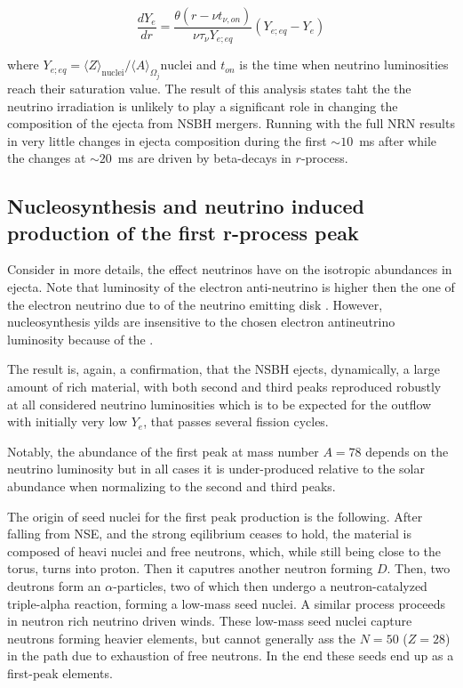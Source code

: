 \begin{equation}
\frac{d Y_e}{dr} = \frac{\theta(r - \nu t_{\nu, on})}{\nu \tau_{\nu} Y_{e; eq}}(Y_{e; eq} - Y_e)
\end{equation}

where $Y_{e; eq} = \langle Z \rangle_{\text{nuclei}} / \langle A \rangle_{\Omega_j}\text{nuclei}$ and $t_{on}$ is the time when neutrino luminosities reach their saturation value.
The result of this analysis states taht the the neutrino irradiation is unlikely to play a significant role in changing the composition of the ejecta from \ac{NSBH} mergers.
Running with the full \ac{NRN} results in very little changes in ejecta composition during the first $\sim10$~ms after while the changes at $\sim20$~ms are driven by beta-decays in $r$-process.


\subsection{Nucleosynthesis and neutrino induced production of the first r-process peak}

Consider in more details, the effect neutrinos have on the isotropic abundances in ejecta. 
Note that luminosity of the electron anti-neutrino is higher then the one of the electron neutrino due to  of the neutrino emitting disk \cite{Foucart:2015gaa}. However, nucleosynthesis yilds are insensitive to the chosen electron antineutrino luminosity because of the .


The result is, again, a confirmation, that the \ac{NSBH} ejects, dynamically, a large amount of \rproc{} rich material, with both second and third \rproc{} peaks reproduced robustly at all considered neutrino luminosities which is to be expected for the outflow with initially very low $Y_e$, that passes several fission cycles. 

Notably, the abundance of the first \rproc{} peak at mass number $A=78$ depends on the neutrino luminosity but in all cases it is under-produced relative to the solar abundance when normalizing to the second and third peaks.

The origin of seed nuclei for the first peak production is the following. After falling from \ac{NSE}, and the strong eqilibrium ceases to hold, the material is composed of heavi nuclei and free neutrons, which, while still being close to the torus, turns into proton. Then it caputres another neutron forming $D$. Then, two deutrons form an $\alpha$-particles, two of which then undergo a neutron-catalyzed triple-alpha reaction, forming a low-mass seed nuclei. A similar process proceeds in neutron rich neutrino driven winds.
These low-mass seed nuclei capture neutrons forming heavier elements, but cannot generally ass the $N=50$ ($Z=28$) in the \rproc{} path due to exhaustion of free neutrons. In the end these seeds end up as a first-peak elements. 


